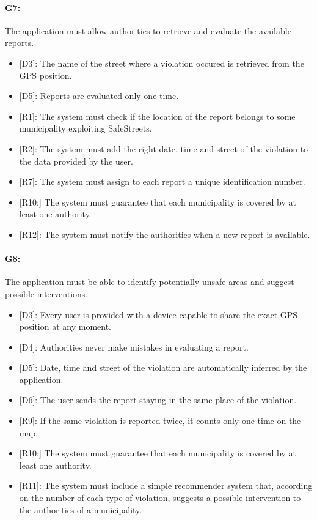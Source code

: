 \documentclass[12pt,a4paper]{report}
\begin{document}
			\paragraph {G7:} The application must allow authorities to retrieve and evaluate the available reports.
				\begin{itemize}
					\item{[D3]:} The name of the street where a violation occured is retrieved from the GPS position.
					\item{[D5]:} Reports are evaluated only one time.
				\end{itemize}
				\begin{itemize}
					\item{[R1]:} The system must check if the location of the report belongs to some municipality exploiting SafeStreets.
					\item{[R2]:} The system must add the right date, time and street of the violation to the data provided by the user.
					\item{[R7]:} The system must assign to each report a unique identification number.
					\item{[R10:]} The system must guarantee that each municipality is covered by at least one authority.
					\item{[R12]:} The system must notify the authorities when a new report is available.
				\end{itemize}
			\paragraph {G8:} The application must be able to identify potentially unsafe areas and suggest possible interventions.
				\begin{itemize}
					\item{[D3]:} Every user is provided with a device capable to share the exact GPS position at any moment.
			 		\item{[D4]:} Authorities never make mistakes in evaluating a report.
					\item{[D5]:} Date, time and street of the violation are automatically inferred by the application.
			 		\item{[D6]:} The user sends the report staying in the same place of the violation.
				\end{itemize}
				\begin{itemize}
					\item{[R9]:} If the same violation is reported twice, it counts only one time on the map.
					\item{[R10:]} The system must guarantee that each municipality is covered by at least one authority.
					\item{[R11]:} The system must include a simple recommender system that, according on the number of each type of violation, suggests a possible intervention to the authorities of a municipality.
				\end{itemize}
\end{document}
